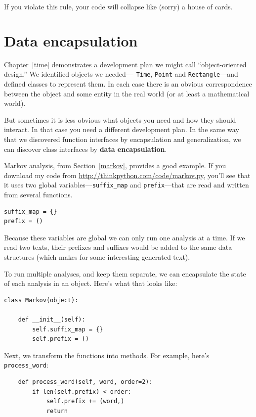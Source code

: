 \documentclass[10pt]{book}
\begin{document}
\begin{CJK}{UTF8}{gbsn}
If you violate this rule, your code will collapse like (sorry)
a house of cards.


\section{Data encapsulation}

Chapter~\ref{time} demonstrates a development plan we might call
``object-oriented design.''  We identified objects we needed---{\tt
  Time}, {\tt Point} and {\tt Rectangle}---and defined classes to
represent them.  In each case there is an obvious correspondence
between the object and some entity in the real world (or at least a
mathematical world).

But sometimes it is less obvious what objects you need
and how they should interact.  In that case you need a different
development plan.  In the same way that we discovered function
interfaces by encapsulation and generalization, we can discover
class interfaces by {\bf data encapsulation}.

Markov analysis, from Section~\ref{markov}, provides a good example.
If you download my code from \url{http://thinkpython.com/code/markov.py},
you'll see that it uses two global variables---\verb"suffix_map" and
\verb"prefix"---that are read and written from several functions.

\begin{verbatim}
suffix_map = {}        
prefix = ()            
\end{verbatim}

Because these variables are global
we can only run one analysis
at a time.  If we read two texts, their prefixes and suffixes would
be added to the same data structures (which makes for some interesting
generated text).

To run multiple analyses, and keep them separate, we can encapsulate
the state of each analysis in an object.
Here's what that looks like:

\begin{verbatim}
class Markov(object):

    def __init__(self):
        self.suffix_map = {}
        self.prefix = ()    
\end{verbatim}

Next, we transform the functions into methods.  For example,
here's \verb"process_word":

\begin{verbatim}
    def process_word(self, word, order=2):
        if len(self.prefix) < order:
            self.prefix += (word,)
            return


\end{verbatim}
\end{CJK}
\end{document}
